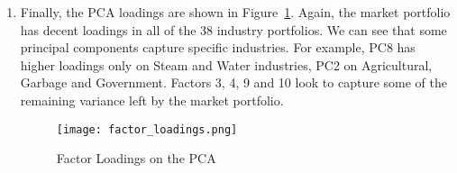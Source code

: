 \begin{solution}
\begin{enumerate}[label = \Alph*)]
    \item Finally, the PCA loadings are shown in Figure~\ref{fig:pca_loadings}. Again, the market portfolio has decent loadings in all of the 38 industry portfolios. We can see that some principal components capture specific industries. For example, PC8 has higher loadings only on Steam and Water industries, PC2 on Agricultural, Garbage and Government. Factors 3, 4, 9 and 10 look to capture some of the remaining variance left by the market portfolio.

    \begin{figure}[!htbp]
        \begin{small}
            \begin{center}
                \texttt{[image: factor\_loadings.png]}
            \end{center}
            \caption{Factor Loadings on the PCA}
            \label{fig:pca_loadings}
        \end{small}
    \end{figure}
    
\end{enumerate}
\end{solution}